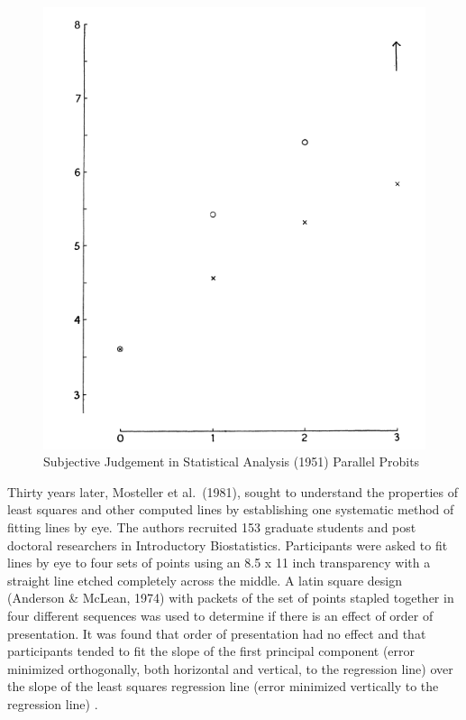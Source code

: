 \documentclass[print]{nuthesis}
\begin{document}
\begin{figure}[tbp]

{\centering \includegraphics[width=0.5\linewidth,]{images/02-you-draw-it/subjective-judgement-plot} 

}

\caption{Subjective Judgement in Statistical Analysis (1951) Parallel Probits}\label{fig:subjective-judgement}
\end{figure}

Thirty years later, Mosteller et al.~(1981), sought to understand the properties of least squares and other computed lines by establishing one systematic method of fitting lines by eye.
The authors recruited 153 graduate students and post doctoral researchers in Introductory Biostatistics.
Participants were asked to fit lines by eye to four sets of points  using an 8.5 x 11 inch transparency with a straight line etched completely across the middle.
A latin square design (Anderson \& McLean, 1974) with packets of the set of points stapled together in four different sequences was used to determine if there is an effect of order of presentation.
It was found that order of presentation had no effect and that participants tended to fit the slope of the first principal component (error minimized orthogonally, both horizontal and vertical, to the regression line) over the slope of the least squares regression line (error minimized vertically to the regression line) .
\end{document}
